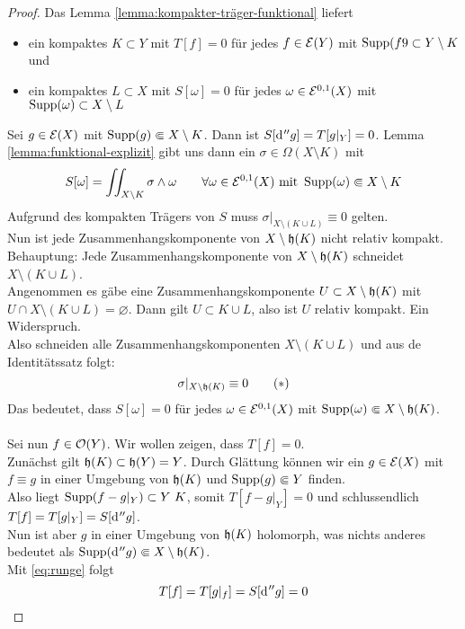 \begin{proof}
  Das Lemma \ref{lemma:kompakter-träger-funktional} liefert
  \begin{itemize}
  \item ein kompaktes $K \subset Y$ mit $T[f] = 0$ für jedes $f \in
    \mathcal{E}(Y)$ mit $\operatorname{Supp}(f9 \subset Y \setminus K$ und
  \item ein kompaktes $L \subset X$ mit $S[\omega] = 0$ für jedes
    $\omega \in \mathcal{E}^{0,1}(X)$ mit $\operatorname{Supp}(\omega) \subset X\setminus L$
  \end{itemize}
   Sei $g \in \mathcal{E}(X)$ mit $\operatorname{Supp}(g) \Subset X \setminus K$. Dann ist
   $S[\d[''g]] = T[g|_Y]  = 0$. Lemma \ref{lemma:funktional-explizit}
   gibt uns dann ein $\sigma \in \Omega(X\setminus K)$ mit
   \[
   S[\omega] = \iint_{X \setminus K}\sigma \wedge \omega \qquad
   \forall \omega \in \mathcal{E}^{0,1}(X) \text{ mit } \operatorname{Supp}(\omega)
   \Subset X\setminus K
   \]
   Aufgrund des kompakten Trägers von $S$ muss $\sigma|_{X \setminus
     (K \cup L)} \equiv 0$ gelten. \\
   Nun ist jede Zusammenhangskomponente von $X \setminus \mathfrak{h}(K)$
   nicht relativ kompakt. \\
   Behauptung: Jede Zusammenhangskomponente von $X \setminus
   \mathfrak{h}(K)$ schneidet $X \setminus (K \cup L)$. \\
   Angenommen es gäbe eine Zusammenhangskomponente $U \subset X
   \setminus \mathfrak{h}(K)$ mit $U \cap X \setminus ( K \cup L) =
   \varnothing$. Dann gilt $U \subset K \cup L$, also ist $U$ relativ
   kompakt. Ein Widerspruch. \\
   Also schneiden alle Zusammenhangskomponenten $X \setminus (K \cup
   L)$ und aus de Identitätssatz folgt:
   \[
   \sigma|_{X \setminus \mathfrak{h}(K)} \equiv 0 \label{eq:runge}\tag{$\ast$}
   \]
   Das bedeutet, dass $S[\omega] = 0$ für jedes $\omega \in
   \mathcal{E}^{0,1}(X)$ mit $\operatorname{Supp}(\omega) \Subset X \setminus
   \mathfrak{h}(K)$.\\
   \\
   Sei nun $f \in \mathcal{O}(Y)$. Wir wollen zeigen, dass $T[f] = 0$. \\
   Zunächst gilt $\mathfrak{h}(K) \subset \mathfrak{h}(Y) = Y$. Durch Glättung
   können wir ein $g \in \mathcal{E}(X)$ mit $f \equiv g$ in einer Umgebung
   von $\mathfrak{h}(K)$ und $\operatorname{Supp}(g) \Subset Y$ finden. \\
   Also liegt $\Supp(f - g|_Y) \subset Y \ K$, somit $T[f- g|_Y] = 0$
   und schlussendlich $T[f] = T[g|_Y] = S[\d[''g]]$. \\
   Nun ist aber $g$ in einer Umgebung von $\mathfrak{h}(K)$ holomorph, was
   nichts anderes bedeutet als $\Supp(\d[''g]) \Subset X \setminus
   \runge(K)$. \\
   Mit \eqref{eq:runge} folgt
   \[
   T[f] = T[g|_f] = S[\d[''g]] = 0
   \]
\end{proof}

